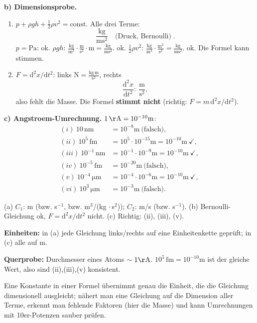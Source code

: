 \textbf{b) Dimensionsprobe.}
\begin{enumerate}
  \item[(i)] $p+\rho gh+\tfrac12\rho v^2=\text{const.}$ Alle drei Terme:
\begin{equation}
  \frac{\unit{\kilogram}}{\unit{\metre\second\squared}}
  \quad\text{(Druck, Bernoulli)}\;.
\end{equation}
$p=\unit{\pascal}$: ok. $\rho gh$: $\tfrac{\mathrm{kg}}{\mathrm m^3}\cdot
\frac{\mathrm m}{\mathrm s^2}\cdot\mathrm m=\frac{\mathrm{kg}}{\mathrm{m s^2}}$. ok.
$\tfrac12\rho v^2$: $\frac{\mathrm{kg}}{\mathrm m^3}\cdot
\frac{\mathrm m^2}{\mathrm s^2}=\frac{\mathrm{kg}}{\mathrm{m s^2}}$. ok.
Die Formel kann stimmen.

  \item[(ii)] $F=\mathrm d^2x/\mathrm dt^2$: links
        \unit{\newton}$=\frac{\mathrm{kg\,m}}{\mathrm s^2}$, rechts
\begin{equation}
  \frac{\mathrm d^2x}{\mathrm dt^2}:\ \frac{\unit{\metre}}{\unit{\second\squared}},
\end{equation}
also fehlt die Masse. Die Formel \textbf{stimmt nicht} (richtig:
$F=m\,\mathrm d^2x/\mathrm dt^2$).
\end{enumerate}

\textbf{c) Angstroem-Umrechnung.} $1\,\mathrm{\AA}=10^{-10}\mathrm m$:
\begin{align}
  (i)\ 10\,\mathrm{nm}&=10^{-8}\mathrm m\ \text{(falsch)},\\
  (ii)\ 10^5\,\mathrm{fm}&=10^5\cdot10^{-15}\mathrm m=10^{-10}\mathrm m\
      \checkmark,\\
  (iii)\ 10^{-1}\,\mathrm{nm}&=10^{-1}\cdot10^{-9}\mathrm m=10^{-10}\mathrm m\
      \checkmark,\\
  (iv)\ 10^{-5}\,\mathrm{fm}&=10^{-20}\mathrm m\ \text{(falsch)},\\
  (v)\ 10^{-4}\,\mathrm{\mu m}&=10^{-4}\cdot10^{-6}\mathrm m=10^{-10}\mathrm m\
      \checkmark,\\
  (vi)\ 10^{3}\,\mathrm{\mu m}&=10^{-3}\mathrm m\ \text{(falsch)}.
\end{align}

\begin{ergebnis}
(a) $C_1$: m (bzw. s$^{-1}$, bzw. m$^3$/(kg$\,\cdot$s$^2$)); $C_2$: m/s
(bzw. s$^{-1}$). (b) Bernoulli-Gleichung ok, $F=\mathrm d^2x/\mathrm dt^2$
nicht. (c) Richtig: (ii), (iii), (v).
\end{ergebnis}

\begin{kontrolle}
\textbf{Einheiten:} in (a) jede Gleichung links/rechts auf eine
Einheitenkette geprüft; in (c) alle auf \unit{\metre}. \checkmark

\textbf{Querprobe:} Durchmesser eines Atoms $\sim1\mathrm{\AA}$.
$10^5\,\mathrm{fm}=10^{-10}\mathrm m$ ist der gleiche Wert, also sind
(ii),(iii),(v) konsistent. \checkmark
\end{kontrolle}

\begin{merksatz}
Eine Konstante in einer Formel übernimmt genau die Einheit, die die
Gleichung dimensionell ausgleicht; nähert man eine Gleichung auf die
Dimension aller Terme, erkennt man fehlende Faktoren (hier die Masse) und
kann Umrechnungen mit 10er-Potenzen sauber prüfen.
\end{merksatz}

